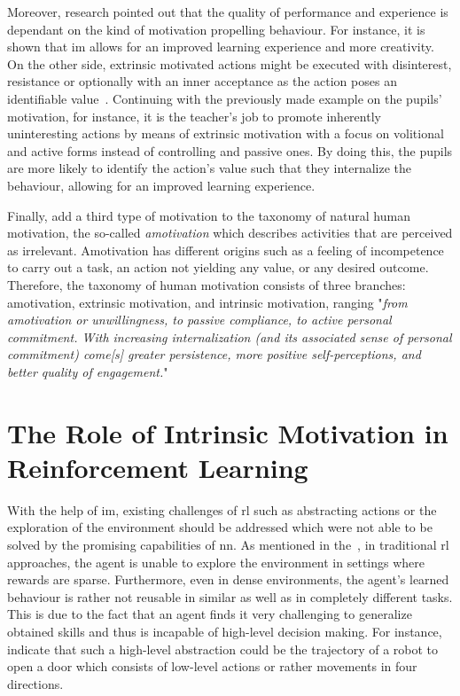 \documentclass[draft,final]{vutinfth} %
\newcommand{\p}[1]{see p. #1}
\begin{document}
    Moreover, research pointed out that the quality of performance and experience is dependant on the kind of motivation propelling behaviour.
    For instance, it is shown that \gls{im} allows for an improved learning experience and more creativity.
    On the other side, extrinsic motivated actions might be executed with disinterest, resistance or optionally with an inner acceptance as the action poses an identifiable value~\citep{ryan_intrinsic_2000}.
    Continuing with the previously made example on the pupils' motivation, for instance, it is the teacher's job to promote inherently uninteresting actions by means of extrinsic motivation with a focus on volitional and active forms instead of controlling and passive ones.
    By doing this, the pupils are more likely to identify the action's value such that they internalize the behaviour, allowing for an improved learning experience.

    Finally, \citeauthor{ryan_intrinsic_2000} add a third type of motivation to the taxonomy of natural human motivation, the so-called \textit{amotivation} which describes activities that are perceived as irrelevant.
    Amotivation has different origins such as a feeling of incompetence to carry out a task, an action not yielding any value, or any desired outcome.
    Therefore, the taxonomy of human motivation consists of three branches: amotivation, extrinsic motivation, and intrinsic motivation, ranging "\textit{from amotivation or unwillingness, to passive compliance, to active personal commitment. With increasing internalization (and its associated sense of personal commitment) come[s] greater persistence, more positive self-perceptions, and better quality of engagement.}"~\citep[\p{60f}]{ryan_intrinsic_2000}


    \section{The Role of Intrinsic Motivation in Reinforcement Learning}

    With the help of \gls{im}, existing challenges of \gls{rl} such as abstracting actions or the exploration of the environment should be addressed which were not able to be solved by the promising capabilities of \gls{nn}.
    As mentioned in the~, in traditional \gls{rl} approaches, the agent is unable to explore the environment in settings where rewards are sparse.
    Furthermore, even in dense environments, the agent's learned behaviour is rather not reusable in similar as well as in completely different tasks.
    This is due to the fact that an agent finds it very challenging to generalize obtained skills and thus is incapable of high-level decision making.
    For instance, \citeauthor{todorov_mujoco_2012} indicate that such a high-level abstraction could be the trajectory of a robot to open a door which consists of low-level actions or rather movements in four directions.
\end{document}

